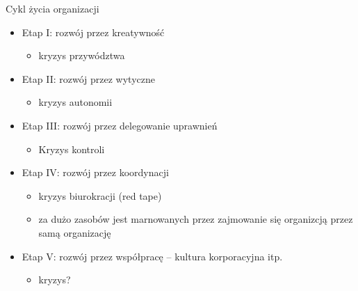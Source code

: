 \documentclass[a4paper,10pt]{report}
\begin{document}
\noindent Cykl życia organizacji
\begin{itemize}
	\item Etap I: rozwój przez kreatywność
	\begin{itemize}
		\item kryzys przywództwa
	\end{itemize}
	\item Etap II: rozwój przez wytyczne
	\begin{itemize}
		\item kryzys autonomii
	\end{itemize}
	\item Etap III: rozwój przez delegowanie uprawnień
	\begin{itemize}
		\item Kryzys kontroli
	\end{itemize}
	\item Etap IV: rozwój przez koordynacji
	\begin{itemize}
		\item kryzys biurokracji (red tape)
		\item za dużo zasobów jest marnowanych przez zajmowanie się organizcją przez samą organizację
	\end{itemize}
	\item Etap V: rozwój przez współpracę -- kultura korporacyjna itp.
	\begin{itemize}
		\item kryzys?
	\end{itemize}
\end{itemize}
\end{document}
